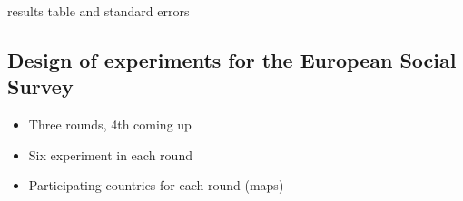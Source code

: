\documentclass{beamer}
\begin{document}
\begin{frame}
 results table and standard errors
\end{frame}

\subsection{Design of experiments for the European Social Survey}

\begin{frame}
\begin{itemize}
	\item Three rounds, 4th coming up
	\item Six experiment in each round
	\item Participating countries for each round (maps)
\end{itemize}
\end{frame}
\end{document}
